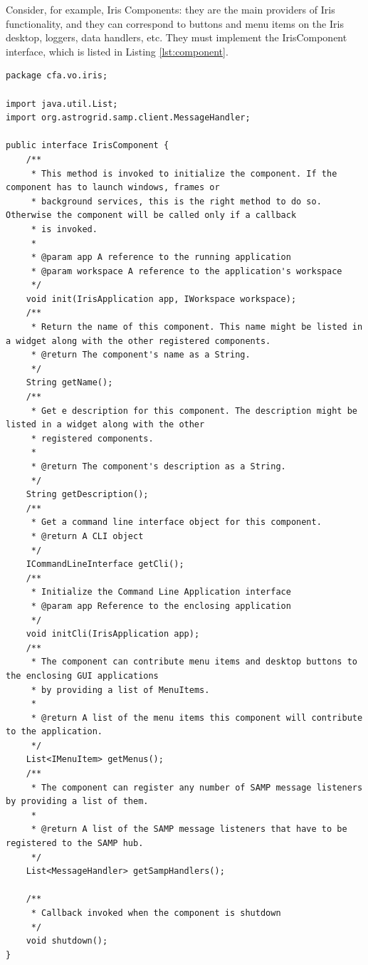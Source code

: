 \documentclass[5p]{elsarticle}
\begin{document}
Consider, for example, Iris Components: they are the main providers of Iris functionality, and they can correspond to buttons and menu items on the Iris desktop, loggers, data handlers, etc. They must implement the IrisComponent interface, which is listed in Listing \ref{lst:component}.


\begin{lstlisting}[style=java, caption=My Caption, label=lst:component]
package cfa.vo.iris;

import java.util.List;
import org.astrogrid.samp.client.MessageHandler;

public interface IrisComponent {
    /**
     * This method is invoked to initialize the component. If the component has to launch windows, frames or
     * background services, this is the right method to do so. Otherwise the component will be called only if a callback
     * is invoked.
     *
     * @param app A reference to the running application
     * @param workspace A reference to the application's workspace
     */
    void init(IrisApplication app, IWorkspace workspace);
    /**
     * Return the name of this component. This name might be listed in a widget along with the other registered components.
     * @return The component's name as a String.
     */
    String getName();
    /**
     * Get e description for this component. The description might be listed in a widget along with the other
     * registered components.
     *
     * @return The component's description as a String.
     */
    String getDescription();
    /**
     * Get a command line interface object for this component.
     * @return A CLI object
     */
    ICommandLineInterface getCli();
    /**
     * Initialize the Command Line Application interface
     * @param app Reference to the enclosing application
     */
    void initCli(IrisApplication app);
    /**
     * The component can contribute menu items and desktop buttons to the enclosing GUI applications
     * by providing a list of MenuItems.
     *
     * @return A list of the menu items this component will contribute to the application.
     */
    List<IMenuItem> getMenus();
    /**
     * The component can register any number of SAMP message listeners by providing a list of them.
     *
     * @return A list of the SAMP message listeners that have to be registered to the SAMP hub.
     */
    List<MessageHandler> getSampHandlers();

    /**
     * Callback invoked when the component is shutdown
     */
    void shutdown();
}
\end{lstlisting}
\end{document}
